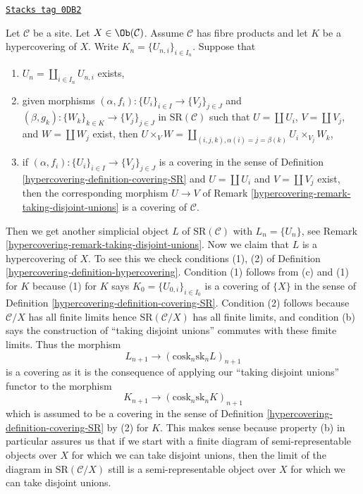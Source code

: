\begin{remark}
\label{hypercovering-remark-take-unions-hypercovering-X}
\href{https://stacks.math.columbia.edu/tag/0DB2}{\texttt{Stacks tag 0DB2}}

Let $\mathcal{C}$ be a site. Let $X \in \Ob(\mathcal{C})$.
Assume $\mathcal{C}$ has fibre products and let $K$ be a hypercovering of $X$.
Write $K_n = \{U_{n, i}\}_{i \in I_n}$. Suppose that
\begin{enumerate}
\item[(a)] $U_n = \coprod_{i \in I_n} U_{n, i}$ exists,
\item[(b)] given morphisms
$(\alpha, f_i) : \{U_i\}_{i \in I} \to \{V_j\}_{j \in J}$ and
$(\beta, g_k) : \{W_k\}_{k \in K} \to \{V_j\}_{j \in J}$
in $\text{SR}(\mathcal{C})$ such that
$U = \coprod U_i$, $V = \coprod V_j$, and $W = \coprod W_j$
exist, then $U \times_V W =
\coprod_{(i, j, k), \alpha(i) = j = \beta(k)} U_i \times_{V_j} W_k$,
\item[(c)] if $(\alpha, f_i) : \{U_i\}_{i \in I} \to \{V_j\}_{j \in J}$
is a covering in the sense of
Definition \ref{hypercovering-definition-covering-SR}
and $U = \coprod U_i$ and $V = \coprod V_j$ exist,
then the corresponding morphism $U \to V$
of Remark \ref{hypercovering-remark-taking-disjoint-unions}
is a covering of $\mathcal{C}$.
\end{enumerate}
Then we get another simplicial object $L$ of $\text{SR}(\mathcal{C})$
with $L_n = \{U_n\}$, see
Remark \ref{hypercovering-remark-taking-disjoint-unions}.
Now we claim that $L$ is a hypercovering of $X$.
To see this we check conditions (1), (2) of
Definition \ref{hypercovering-definition-hypercovering}.
Condition (1) follows from (c) and (1) for $K$
because (1) for $K$ says $K_0 = \{U_{0, i}\}_{i \in I_0}$
is a covering of $\{X\}$ in the sense of
Definition \ref{hypercovering-definition-covering-SR}.
Condition (2) follows because $\mathcal{C}/X$ has
all finite limits hence $\text{SR}(\mathcal{C}/X)$
has all finite limits, and condition (b) says the
construction of ``taking disjoint unions'' commutes
with these fimite limits. Thus the morphism
$$
L_{n + 1} \longrightarrow (\text{cosk}_n \text{sk}_n L)_{n + 1}
$$
is a covering as it is the consequence of applying our
``taking disjoint unions'' functor to the morphism
$$
K_{n + 1} \longrightarrow (\text{cosk}_n \text{sk}_n K)_{n + 1}
$$
which is assumed to be a covering in the sense of
Definition \ref{hypercovering-definition-covering-SR} by (2) for $K$.
This makes sense because property (b) in particular assures
us that if we start with a finite diagram of
semi-representable objects over $X$
for which we can take disjoint unions, then
the limit of the diagram in $\text{SR}(\mathcal{C}/X)$
still is a semi-representable object over $X$ for which
we can take disjoint unions.
\end{remark}



